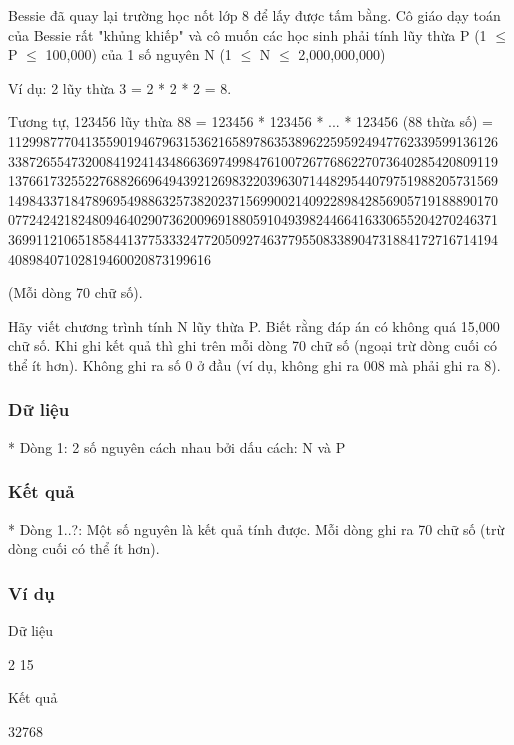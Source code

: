 



   Bessie đã quay lại trường học nốt lớp 8 để lấy được tấm bằng. Cô giáo dạy toán của Bessie rất "khủng khiếp" và cô muốn các học sinh phải tính lũy thừa P (1  $\le$  P  $\le$  100,000) của 1 số nguyên N (1  $\le$  N  $\le$  2,000,000,000)  

   Ví dụ: 2 lũy thừa 3 = 2 * 2 * 2 = 8.  

   Tương tự, 123456 lũy thừa 88 = 123456 * 123456 * ... * 123456 (88  thừa số) =  1129987770413559019467963153621658978635389622595924947762339599136126 3387265547320084192414348663697499847610072677686227073640285420809119 1376617325522768826696494392126983220396307144829544079751988205731569 1498433718478969549886325738202371569900214092289842856905719188890170 0772424218248094640290736200969188059104939824466416330655204270246371 3699112106518584413775333247720509274637795508338904731884172716714194 40898407102819460020873199616  

   (Mỗi dòng 70 chữ số).  

   Hãy viết chương trình tính N lũy thừa P. Biết rằng đáp án có không quá 15,000 chữ số. Khi ghi kết quả thì ghi trên mỗi dòng 70 chữ số (ngoại trừ dòng cuối có thể ít hơn). Không ghi ra số 0 ở đầu (ví dụ, không ghi ra  008 mà phải ghi ra 8).  

\subsubsection{   Dữ liệu  }

   * Dòng 1: 2 số nguyên cách nhau bởi dấu cách: N và P  

\subsubsection{   Kết quả  }

   * Dòng 1..?: Một số nguyên là kết quả tính được.  Mỗi dòng ghi ra 70 chữ số (trừ dòng cuối có thể ít hơn).  

\subsubsection{   Ví dụ  }

   Dữ liệu  

   2 15  








   Kết quả  

   32768  
